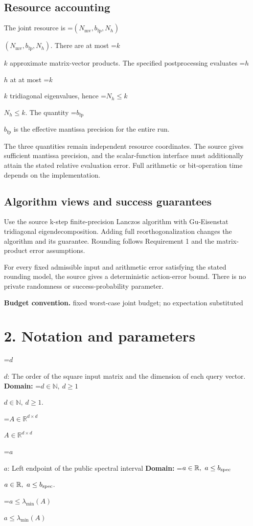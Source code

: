 \documentclass[10pt,a4paper]{article}
\newcommand{\AtlasMath}[1]{\par\begingroup\centering\setbox0=\hbox{$\displaystyle #1$}\ifdim\wd0>1.4\linewidth\typeout{ATLAS WIDE FORMULA: \the\wd0}\fi\ifdim\wd0>\linewidth\resizebox{\linewidth}{!}{\box0}\else\box0\fi\par\endgroup}
\newcommand{\AtlasInlineMath}[1]{\begingroup\setbox0=\hbox{$#1$}\ifdim\wd0>.4\linewidth\endgroup\AtlasMath{#1}\else\endgroup$#1$\fi}
\begin{document}
\subsection{Resource accounting}
The joint resource is \AtlasInlineMath{(N_{\mathrm{mv}},b_{\mathrm{fp}},N_h)}. There are at most \AtlasInlineMath{k} approximate matrix-vector products. The specified postprocessing evaluates \AtlasInlineMath{h} at at most \AtlasInlineMath{k} tridiagonal eigenvalues, hence \AtlasInlineMath{N_h\le k}. The quantity \AtlasInlineMath{b_{\mathrm{fp}}} is the effective mantissa precision for the entire run.

The three quantities remain independent resource coordinates. The source gives sufficient mantissa precision, and the scalar-function interface must additionally attain the stated relative evaluation error. Full arithmetic or bit-operation time depends on the implementation.

\subsection{Algorithm views and success guarantees}
Use the source k-step finite-precision Lanczos algorithm with Gu-Eisenstat tridiagonal eigendecomposition. Adding full reorthogonalization changes the algorithm and its guarantee. Rounding follows Requirement 1 and the matrix-product error assumptions.

For every fixed admissible input and arithmetic error satisfying the stated rounding model, the source gives a deterministic action-error bound. There is no private randomness or success-probability parameter.

\textbf{Budget convention.} fixed worst-case joint budget; no expectation substituted

\section{2. Notation and parameters}
\AtlasInlineMath{d}: The order of the square input matrix and the dimension of each query vector. \textbf{Domain:} \AtlasInlineMath{d\in\mathbb N,\ d\ge1}.

\AtlasInlineMath{A\in\mathbb R^{d\times d}}

\AtlasInlineMath{a}: Left endpoint of the public spectral interval \textbf{Domain:} \AtlasInlineMath{a\in\mathbb R,\ a\le b_{\rm spec}}.

\AtlasInlineMath{a\le\lambda_{\min}(A)}
\end{document}
